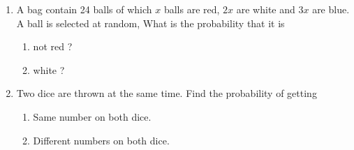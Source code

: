 \begin{enumerate}[label=\thesection.\arabic*,ref=\thesection.\theenumi]
\begin{enumerate}
\end{enumerate}
	
 \item A bag contain 24 balls of which $x$ balls are red, $2x$ are white and $3x$ are blue. A ball is selected at random, What is the probability that it is
\begin{enumerate}[label=\alph*)]
\item not red ?
\item white ?
\end{enumerate}

\item Two dice are thrown at the same time. Find the probability of getting
	\begin{enumerate}
    		\item Same number on both dice.
    		\item Different numbers on both dice.
	\end{enumerate}

\end{enumerate}
